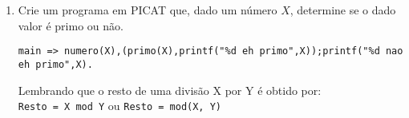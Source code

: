 \documentclass[11pt, a4paper,final]{article}
\begin{document}
\begin{enumerate}
\begin{enumerate}
 
  
	\item Crie um programa em PICAT que, dado um número $X$, determine se o dado valor é primo ou não.
	
	\begin{footnotesize}
	{\tt main => numero(X),(primo(X),printf("\%d eh primo",X));printf("\%d nao eh primo",X). }
	\end{footnotesize}
	
	Lembrando que o resto de uma divisão X por Y é obtido por:\\ \texttt{Resto = X mod Y}  ou   \texttt{Resto = mod(X, Y)}
	
\end{enumerate}



  



\end{enumerate}
\end{document}

